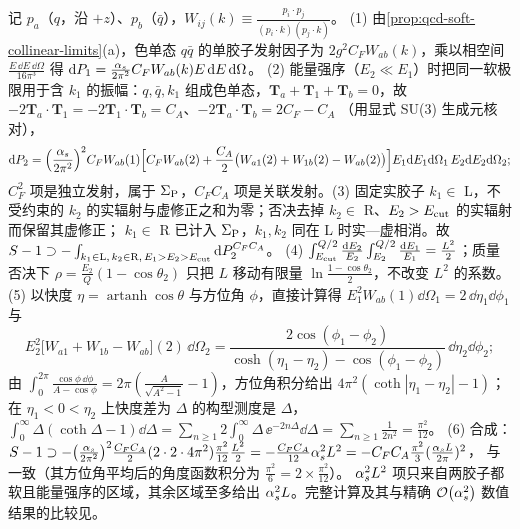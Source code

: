 \begin{proofsketch}
记 $p_a$（$q$，沿 $+z$）、$p_b$（$\bar q$），$W_{ij}(k)\equiv\frac{p_i\cdot p_j}{(p_i\cdot k)(p_j\cdot k)}$。
(1) 由\cref{prop:qcd-soft-collinear-limits}(a)，色单态 $q\bar q$ 的单胶子发射因子为 $2g^2C_FW_{ab}(k)$，乘以相空间 $\frac{E\,\dd E\,\dd\Omega}{16\pi^3}$ 得 $\mathrm{d} P_1=\frac{\alpha_s}{2\pi^2}C_FW_{ab}(k)E\,\mathrm{d} E\,\mathrm{d}\Omega$。
(2) 能量强序（$E_2\ll E_1$）时把同一软极限用于含 $k_1$ 的振幅：$q,\bar q,k_1$ 组成色单态，$\bm T_a+\bm T_1+\bm T_b=0$，故 $-2\bm T_a\cdot\bm T_1=-2\bm T_1\cdot\bm T_b=C_A$、$-2\bm T_a\cdot\bm T_b=2C_F-C_A$
（用显式 SU(3) 生成元核对），
\[
\mathrm{d} P_2=\Big(\frac{\alpha_s}{2\pi^2}\Big)^2C_FW_{ab}(1)\Big[C_FW_{ab}(2)+\frac{C_A}{2}\big(W_{a1}(2)+W_{1b}(2)-W_{ab}(2)\big)\Big]E_1\mathrm{d} E_1\mathrm{d}\Omega_1\,E_2\mathrm{d} E_2\mathrm{d}\Omega_2 ;
\]
$C_F^2$ 项是独立发射，属于 $\Sigma_{\rm P}$，$C_FC_A$ 项是关联发射。(3) 固定实胶子 $k_1\in$ L，不受约束的 $k_2$ 的实辐射与虚修正之和为零；否决去掉 $k_2\in$ R、$E_2>E_{\rm cut}$ 的实辐射而保留其虚修正；
$k_1\in$ R 已计入 $\Sigma_{\rm P}$，$k_1,k_2$ 同在 L 时实—虚相消。故 $S-1\supset-\int_{k_1\in{\rm L},\,k_2\in{\rm R},\,E_1>E_2>E_{\rm cut}}\mathrm{d} P_2^{C_FC_A}$。
(4) $\int_{E_{\rm cut}}^{Q/2}\frac{\mathrm{d} E_2}{E_2}\int_{E_2}^{Q/2}\frac{\mathrm{d} E_1}{E_1}=\frac{L^2}{2}$；质量否决下 $\rho=\frac{E_2}{Q}(1-\cos\theta_2)$ 只把 $L$ 移动有限量 $\ln\frac{1-\cos\theta_2}{2}$，不改变 $L^2$ 的系数。
(5) 以快度 $\eta=\operatorname{artanh}\cos\theta$ 与方位角 $\phi$，直接计算得 $E_1^2W_{ab}(1)\dd\Omega_1=2\,\dd\eta_1\dd\phi_1$ 与
\[
E_2^2\big[W_{a1}+W_{1b}-W_{ab}\big](2)\,\dd\Omega_2=\frac{2\cos(\phi_1-\phi_2)}{\cosh(\eta_1-\eta_2)-\cos(\phi_1-\phi_2)}\,\dd\eta_2\dd\phi_2 ;
\]
由 $\int_0^{2\pi}\frac{\cos\phi\,\dd\phi}{A-\cos\phi}=2\pi(\frac{A}{\sqrt{A^2-1}}-1)$，方位角积分给出 $4\pi^2(\coth|\eta_1-\eta_2|-1)$；在 $\eta_1<0<\eta_2$ 上快度差为 $\Delta$ 的构型测度是 $\Delta$，
$\int_0^\infty\Delta(\coth\Delta-1)\dd\Delta=\sum_{n\ge1}2\int_0^\infty\Delta\,\ee^{-2n\Delta}\dd\Delta=\sum_{n\ge1}\frac{1}{2n^2}=\frac{\pi^2}{12}$。
(6) 合成：$S-1\supset-\big(\frac{\alpha_s}{2\pi^2}\big)^2\frac{C_FC_A}{2}(2\cdot2\cdot4\pi^2)\frac{\pi^2}{12}\frac{L^2}{2}=-\frac{C_FC_A}{12}\alpha_s^2L^2=-C_FC_A\frac{\pi^2}{3}(\frac{\alpha_s L}{2\pi})^2$，
与\cite[式~(11)]{DasguptaSalam2001}一致（其方位角平均后的角度函数积分为 $\frac{\pi^2}{6}=2\times\frac{\pi^2}{12}$）。
$\alpha_s^2L^2$ 项只来自两胶子都软且能量强序的区域，其余区域至多给出 $\alpha_s^2L$。完整计算及其与精确 $\mathcal{O}\!\left(\alpha_s^2\right)$ 数值结果的比较见\cite[第~2、4~节]{DasguptaSalam2001}。
\end{proofsketch}


